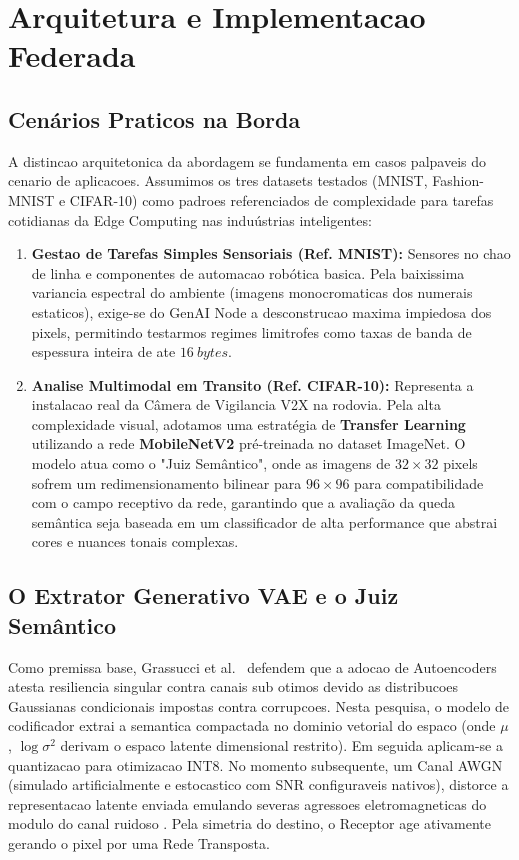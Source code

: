\documentclass[conference]{IEEEtran}
\begin{document}
\section{Arquitetura e Implementacao Federada}

\subsection{Cenários Praticos na Borda}

A distincao arquitetonica da abordagem se fundamenta em casos palpaveis do cenario de aplicacoes. Assumimos os tres datasets testados (MNIST, Fashion-MNIST e CIFAR-10) como padroes referenciados de complexidade para tarefas cotidianas da Edge Computing nas induústrias inteligentes:
\begin{enumerate}
    \item \textbf{Gestao de Tarefas Simples Sensoriais (Ref. MNIST):} Sensores no chao de linha e componentes de automacao robótica basica. Pela baixissima variancia espectral do ambiente (imagens monocromaticas dos numerais estaticos), exige-se do GenAI Node a desconstrucao maxima impiedosa dos pixels, permitindo testarmos regimes limitrofes como taxas de banda de espessura inteira de ate $16~bytes$. 
    \item \textbf{Analise Multimodal em Transito (Ref. CIFAR-10):} Representa a instalacao real da Câmera de Vigilancia V2X na rodovia. Pela alta complexidade visual, adotamos uma estratégia de \textbf{Transfer Learning} utilizando a rede \textbf{MobileNetV2} pré-treinada no dataset ImageNet. O modelo atua como o "Juiz Semântico", onde as imagens de $32\times32$ pixels sofrem um redimensionamento bilinear para $96\times96$ para compatibilidade com o campo receptivo da rede, garantindo que a avaliação da queda semântica seja baseada em um classificador de alta performance que abstrai cores e nuances tonais complexas.
\end{enumerate}

\subsection{O Extrator Generativo VAE e o Juiz Semântico}

Como premissa base, Grassucci et al.~\cite{grassucci2023genai_meets_semcom} defendem que a adocao de Autoencoders atesta resiliencia singular contra canais sub otimos devido as distribucoes Gaussianas condicionais impostas contra corrupcoes. 
Nesta pesquisa, o modelo de codificador extrai a semantica compactada no dominio vetorial do espaco (onde $\mu$, $\log\sigma^2$ derivam o espaco latente dimensional restrito). Em seguida aplicam-se a quantizacao para otimizacao INT8. No momento subsequente, um Canal AWGN (simulado artificialmente e estocastico com SNR configuraveis nativos), distorce a representacao latente enviada emulando severas agressoes eletromagneticas do modulo do canal ruidoso \cite{xia2023gennet_layer}. 
Pela simetria do destino, o Receptor age ativamente gerando o pixel por uma Rede Transposta.
\end{document}
